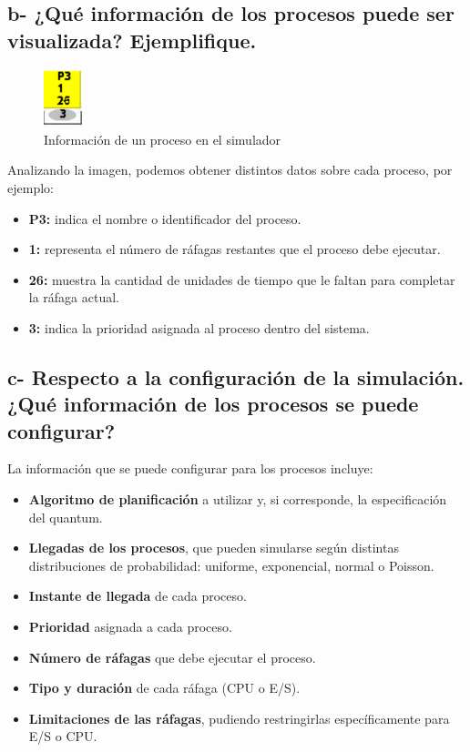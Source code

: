 \documentclass{article}
\begin{document}
\subsection*{b- ¿Qué información de los procesos puede ser visualizada? Ejemplifique.}
\begin{figure}[h]
  \centering
  \includegraphics[width=0.1\textwidth]{resources/3b.png}
  \caption{Información de un proceso en el simulador}
\end{figure}

\noindent
Analizando la imagen, podemos obtener distintos datos sobre cada proceso, por ejemplo:

\begin{itemize}
  \item \textbf{P3:} indica el nombre o identificador del proceso.
  \item \textbf{1:} representa el número de ráfagas restantes que el proceso debe ejecutar.
  \item \textbf{26:} muestra la cantidad de unidades de tiempo que le faltan para completar la ráfaga actual.
  \item \textbf{3:} indica la prioridad asignada al proceso dentro del sistema.
\end{itemize}

\subsection*{c- Respecto a la configuración de la simulación. ¿Qué información de los procesos se puede configurar?}

\noindent
La información que se puede configurar para los procesos incluye:
\begin{itemize}
  \item \textbf{Algoritmo de planificación} a utilizar y, si corresponde, la especificación del quantum.
  \item \textbf{Llegadas de los procesos}, que pueden simularse según distintas distribuciones de probabilidad: 
  uniforme, exponencial, normal o Poisson.
  \item \textbf{Instante de llegada} de cada proceso.
  \item \textbf{Prioridad} asignada a cada proceso.
  \item \textbf{Número de ráfagas} que debe ejecutar el proceso.
  \item \textbf{Tipo y duración} de cada ráfaga (CPU o E/S).
  \item \textbf{Limitaciones de las ráfagas}, pudiendo restringirlas específicamente para E/S o CPU.\@
\end{itemize}
\end{document}

